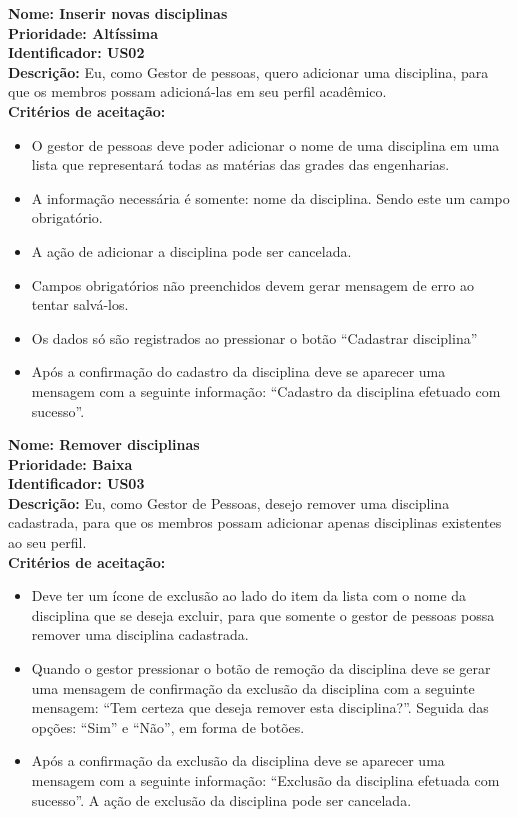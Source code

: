 \begin{anexosenv}
\textbf{Nome: Inserir novas disciplinas\\
    Prioridade: Altíssima\\
    Identificador: US02\\
    Descrição:} Eu, como Gestor de pessoas, quero adicionar uma disciplina, para que os membros possam adicioná-las em seu perfil acadêmico.\\
\textbf{Critérios de aceitação:}
\begin{itemize}
            \item O gestor de pessoas deve poder adicionar o nome de uma disciplina em uma lista que representará todas as matérias das grades das engenharias.
            \item A informação necessária é somente: nome da disciplina. Sendo este um campo obrigatório.
            \item A ação de adicionar a disciplina pode ser cancelada.
            \item Campos obrigatórios não preenchidos devem gerar mensagem de erro ao tentar salvá-los.
            \item Os dados só são registrados ao pressionar o botão “Cadastrar disciplina”
            \item   Após a confirmação do cadastro da disciplina deve se aparecer uma mensagem com a seguinte informação: “Cadastro da disciplina efetuado com sucesso”.
\end{itemize}


\textbf{Nome: Remover disciplinas\\
    Prioridade: Baixa\\
    Identificador: US03\\
    Descrição:} Eu, como Gestor de Pessoas, desejo remover uma disciplina cadastrada, para que os membros possam adicionar apenas disciplinas existentes ao seu perfil.\\
\textbf{Critérios de aceitação:}        
 \begin{itemize}
            \item Deve ter um ícone de exclusão ao lado do item da lista com o nome da disciplina que se deseja excluir, para que somente o gestor de pessoas possa remover uma disciplina cadastrada.
            \item Quando o gestor pressionar o botão de remoção da disciplina deve se gerar uma mensagem de confirmação da exclusão da disciplina com a seguinte mensagem: “Tem certeza que deseja remover esta disciplina?”. Seguida das opções: “Sim” e “Não”, em forma de botões. 
            \item Após a confirmação da exclusão da disciplina deve se aparecer uma mensagem com a seguinte informação: “Exclusão da disciplina efetuada com sucesso”.
            A ação de exclusão da disciplina pode ser cancelada.
\end{itemize}


\end{anexosenv}
